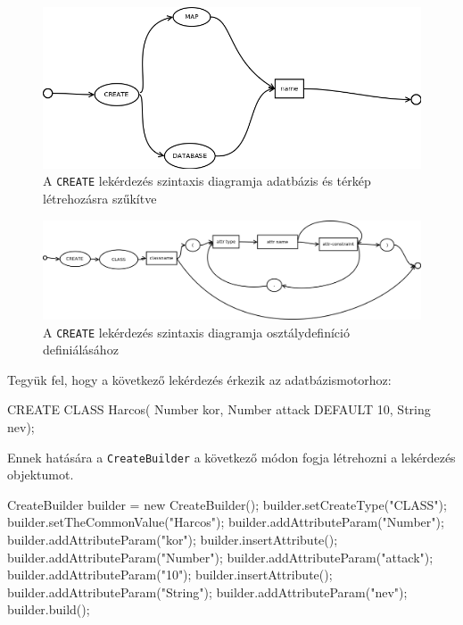 \begin{figure}[htb]
	\begin{center}
		\includegraphics[scale=0.4]{images/create}
		\caption{A \texttt{CREATE} lekérdezés szintaxis diagramja adatbázis és térkép létrehozásra szűkítve}
		\label{fig:createSytnax}
	\end{center}
\end{figure}

\begin{figure}[htb]
	\begin{center}
		\includegraphics[scale=0.38]{images/createclass}
		\caption{A \texttt{CREATE} lekérdezés szintaxis diagramja osztálydefiníció definiálásához}
		\label{fig:createClassSytnax}
	\end{center}
\end{figure}

Tegyük fel, hogy a következő lekérdezés érkezik az adatbázismotorhoz:
\begin{sql}
CREATE CLASS Harcos(
Number kor,
Number attack DEFAULT 10,
String nev);
\end{sql}

Ennek hatására a \texttt{CreateBuilder} a következő módon fogja létrehozni a lekérdezés objektumot.

\begin{java}
CreateBuilder builder = new CreateBuilder();
builder.setCreateType("CLASS");
builder.setTheCommonValue("Harcos");
builder.addAttributeParam("Number");
builder.addAttributeParam("kor");
builder.insertAttribute();
builder.addAttributeParam("Number");
builder.addAttributeParam("attack");
builder.addAttributeParam("10");
builder.insertAttribute();
builder.addAttributeParam("String");
builder.addAttributeParam("nev");
builder.build();
\end{java}

